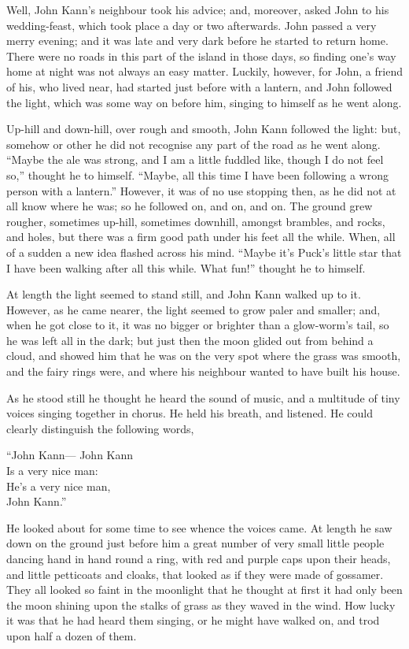 \documentclass[
  12pt,
  a5paper,
  twoside]{book}
\begin{document}
Well, John Kann's neighbour took his advice; and, moreover, asked John
to his wedding-feast, which took place a day or two afterwards. John
passed a very merry evening; and it was late and very dark before he
started to return home. There were no roads in this part of the island
in those days, so finding one's way home at night was not always an easy
matter. Luckily, however, for John, a friend of his, who lived near, had
started just before with a lantern, and John followed the light, which
was some way on before him, singing to himself as he went along.

Up-hill and down-hill, over rough and smooth, John Kann followed the
light: but, somehow or other he did not recognise any part of the road
as he went along. ``Maybe the ale was strong, and I am a little fuddled
like, though I do not feel so,'' thought he to himself. ``Maybe, all
this time I have been following a wrong person with a lantern.''
However, it was of no use stopping then, as he did not at all know where
he was; so he followed on, and on, and on. The ground grew rougher,
sometimes up-hill, sometimes downhill, amongst brambles, and rocks, and
holes, but there was a firm good path under his feet all the while.
When, all of a sudden a new idea flashed across his mind. ``Maybe it's
Puck's little star that I have been walking after all this while. What
fun!'' thought he to himself.

At length the light seemed to stand still, and John Kann walked up to
it. However, as he came nearer, the light seemed to grow paler and
smaller; and, when he got close to it, it was no bigger or brighter than
a glow-worm's tail, so he was left all in the dark; but just then the
moon glided out from behind a cloud, and showed him that he was on the
very spot where the grass was smooth, and the fairy rings were, and
where his neighbour wanted to have built his house.

As he stood still he thought he heard the sound of music, and a
multitude of tiny voices singing together in chorus. He held his breath,
and listened. He could clearly distinguish the following words,

``John Kann--- John Kann\\
Is a very nice man:\\
He's a very nice man,\\
John Kann.''

He looked about for some time to see whence the voices came. At length
he saw down on the ground just before him a great number of very small
little people dancing hand in hand round a ring, with red and purple
caps upon their heads, and little petticoats and cloaks, that looked as
if they were made of gossamer. They all looked so faint in the moonlight
that he thought at first it had only been the moon shining upon the
stalks of grass as they waved in the wind. How lucky it was that he had
heard them singing, or he might have walked on, and trod upon half a
dozen of them.
\end{document}
